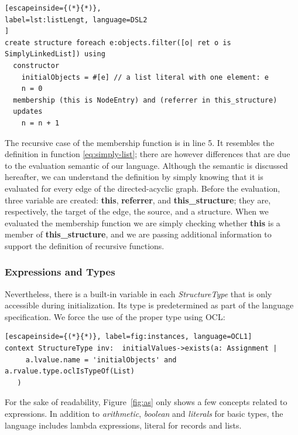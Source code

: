 \begin{lstlisting}[escapeinside={(*}{*)}, 
label=lst:listLengt, language=DSL2
]
create structure foreach e:objects.filter([o| ret o is SimplyLinkedList]) using
  constructor
    initialObjects = #[e] // a list literal with one element: e
    n = 0
  membership (this is NodeEntry) and (referrer in this_structure)
  updates 
    n = n + 1
\end{lstlisting}

The recursive case of the membership function is in line 5.
It resembles the definition in function \ref{eq:simply-list}; there are however differences that are due to the evaluation semantic of our language.
Although the semantic is discussed hereafter, we can understand the definition by simply knowing that it is evaluated for every edge of the directed-acyclic graph.
Before the evaluation, three variable are created: \textbf{this}, \textbf{referrer}, and \textbf{this\_structure}; they are, respectively, the target of the edge, the source, and a structure.
When we evaluated the membership function we are simply checking whether \textbf{this} is a member of \textbf{this\_structure}, and we are passing additional information to support the definition of recursive functions.



\subsubsection*{Expressions and Types}


Nevertheless, there is a built-in variable in each \textit{StructureType} that is only accessible during initialization.
Its type is predetermined as part of the language specification.
We force the use of the proper type using OCL:

\begin{lstlisting}[escapeinside={(*}{*)}, label=fig:instances, language=OCL1]
context StructureType inv:  initialValues->exists(a: Assignment | 
     a.lvalue.name = 'initialObjects' and a.rvalue.type.oclIsTypeOf(List)
   ) 
\end{lstlisting}


For the sake of readability, Figure~\ref{fig:as} only shows a few concepts related to expressions.
In addition to \textit{arithmetic}, \textit{boolean} and \textit{literals} for basic types, the language includes lambda expressions, literal for records and lists.

